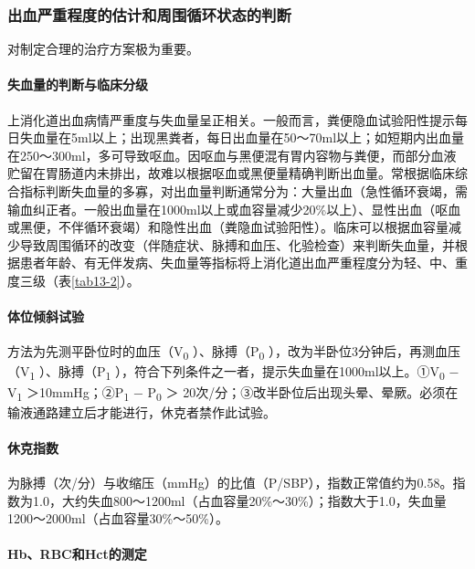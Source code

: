 \subsubsection{出血严重程度的估计和周围循环状态的判断}

对制定合理的治疗方案极为重要。

\paragraph{失血量的判断与临床分级}

上消化道出血病情严重度与失血量呈正相关。一般而言，粪便隐血试验阳性提示每日失血量在5ml以上；出现黑粪者，每日出血量在50～70ml以上；如短期内出血量在250～300ml，多可导致呕血。因呕血与黑便混有胃内容物与粪便，而部分血液贮留在胃肠道内未排出，故难以根据呕血或黑便量精确判断出血量。常根据临床综合指标判断失血量的多寡，对出血量判断通常分为：大量出血（急性循环衰竭，需输血纠正者。一般出血量在1000ml以上或血容量减少20\%以上）、显性出血（呕血或黑便，不伴循环衰竭）和隐性出血（粪隐血试验阳性）。临床可以根据血容量减少导致周围循环的改变（伴随症状、脉搏和血压、化验检查）来判断失血量，并根据患者年龄、有无伴发病、失血量等指标将上消化道出血严重程度分为轻、中、重度三级（表\ref{tab13-2}）。

\paragraph{体位倾斜试验}

方法为先测平卧位时的血压（V\textsubscript{0}
）、脉搏（P\textsubscript{0}
），改为半卧位3分钟后，再测血压（V\textsubscript{1}
）、脉搏（P\textsubscript{1}
），符合下列条件之一者，提示失血量在1000ml以上。①V\textsubscript{0} −
V\textsubscript{1} ＞10mmHg；②P\textsubscript{1} − P\textsubscript{0} ＞
20次/分；③改半卧位后出现头晕、晕厥。必须在输液通路建立后才能进行，休克者禁作此试验。

\paragraph{休克指数}

为脉搏（次/分）与收缩压（mmHg）的比值（P/SBP），指数正常值约为0.58。指数为1.0，大约失血800～1200ml（占血容量20\%～30\%）；指数大于1.0，失血量1200～2000ml（占血容量30\%～50\%）。

\paragraph{Hb、RBC和Hct的测定}

